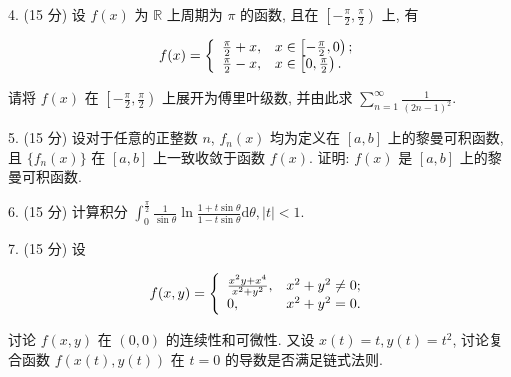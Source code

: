 \documentclass{examcollection}
\renewcommand{\displayformula}[1]{\[#1\]}
\begin{document}
{\begin{minipage}{\textwidth}
4. (15 分) 设 $f(x)$ 为 $\mathbb{R}$ 上周期为 $\pi$ 的函数, 且在 $\left[-\frac{\pi}{2}, \frac{\pi}{2}\right)$ 上, 有\par
\displayformula{f (x) = \left\{ \begin{array}{l l} \frac {\pi}{2} + x, & x \in \left[ - \frac {\pi}{2}, 0\right); \\ \frac {\pi}{2} - x, & x \in \left[ 0, \frac {\pi}{2}\right). \end{array} \right.}\par
请将 $f(x)$ 在 $\left[-\frac{\pi}{2}, \frac{\pi}{2}\right)$ 上展开为傅里叶级数, 并由此求 $\sum_{n=1}^{\infty} \frac{1}{(2n-1)^2}$.\par
5. (15 分) 设对于任意的正整数 $n$, $f_n(x)$ 均为定义在 $[a, b]$ 上的黎曼可积函数, 且 $\{f_n(x)\}$ 在 $[a, b]$ 上一致收敛于函数 $f(x)$. 证明: $f(x)$ 是 $[a, b]$ 上的黎曼可积函数.\par
6. (15 分) 计算积分 $\int_{0}^{\frac{\pi}{2}} \frac{1}{\sin \theta} \ln \frac{1 + t \sin \theta}{1 - t \sin \theta} \mathrm{d}\theta, |t| < 1.$\par
7. (15 分) 设\par
\displayformula{f (x, y) = \left\{ \begin{array}{l l} \frac {x ^ {2} y + x ^ {4}}{x ^ {2} + y ^ {2}}, & x ^ {2} + y ^ {2} \neq 0; \\ 0, & x ^ {2} + y ^ {2} = 0. \end{array} \right.}\par
讨论 $f(x,y)$ 在 $(0,0)$ 的连续性和可微性. 又设 $x(t) = t, y(t) = t^2$, 讨论复合函数 $f(x(t),y(t))$ 在 $t = 0$ 的导数是否满足链式法则.\par
\end{minipage}}
\ifdim\dimexpr\ht\proofbox+\dp\proofbox\relax>\textheight
\noindent\resizebox{!}{\textheight}{\usebox{\proofbox}}\else\noindent\usebox{\proofbox}\fi\clearpage
\end{document}
